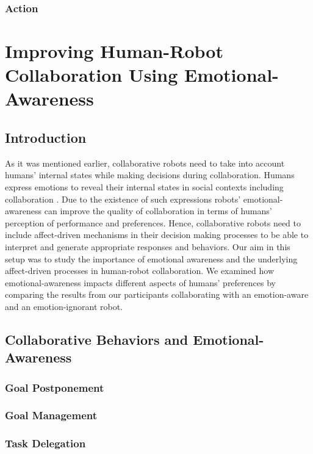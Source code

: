 \documentclass[12pt]{report}
\begin{document}
\subsection{Action}

\chapter{Improving Human-Robot Collaboration Using Emotional-Awareness}
\label{ch:awareness}

\section{Introduction}

As it was mentioned earlier, collaborative robots need to take into account
humans' internal states while making decisions during collaboration. Humans
express emotions to reveal their internal states in social contexts including
collaboration \cite{breazeal:sociable-interactive-robots}. Due to the existence
of such expressions robots' emotional-awareness can improve the quality of
collaboration in terms of humans' perception of performance and preferences.
Hence, collaborative robots need to include affect-driven mechanisms in their
decision making processes to be able to interpret and generate appropriate
responses and behaviors. Our aim in this setup was to study the importance of
emotional awareness and the underlying affect-driven processes in human-robot
collaboration. We examined how emotional-awareness impacts different aspects of
humans' preferences by comparing the results from our participants collaborating
with an emotion-aware and an emotion-ignorant robot.

\section{Collaborative Behaviors and Emotional-Awareness}

\subsection{Goal Postponement}

\subsection{Goal Management}

\subsection{Task Delegation}
\end{document}

